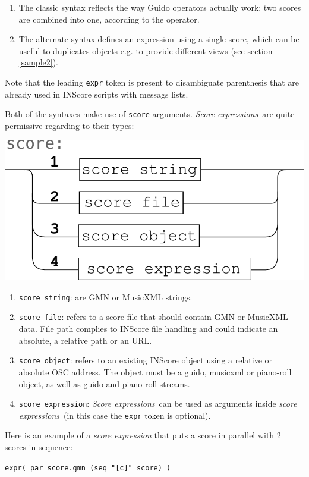 \documentclass{article}
\newcommand{\OSC}[1]{\texttt{#1}}
\newcommand{\sExpr}{\emph{score expressions}}
\newcommand{\SExpr}{\emph{Score expressions}}
\newcommand{\sample}	[1]			{\vspace{-0.2em}\begin{center}\colorbox{mygrey}{\begin{minipage}[t]{0.95\columnwidth} {\small \texttt{#1}}\end{minipage}}\end{center}}
\begin{document}
\begin{enumerate}
\item The classic syntax reflects the way Guido operators actually work: two scores are combined into one, according to the operator.
\item The alternate syntax defines an expression using a single score, which can be useful to duplicates objects e.g. to provide different views (see section \ref{sample2}).
\end{enumerate}

Note that the leading \OSC{expr} token is present to disambiguate parenthesis that are already used in INScore scripts with messags lists.

Both of the syntaxes make use of \OSC{score} arguments. \SExpr\ are quite permissive regarding to their types:
\begin{center}
\includegraphics[width=0.7\columnwidth]{imgs/syntax2}
\end{center}

\begin{enumerate}
\item \OSC{score string}: are GMN or MusicXML strings.
\item \OSC{score file}:  refers to a score file that should contain GMN or MusicXML data. File path complies to INScore file handling and could indicate an absolute, a relative path or an URL.
\item \OSC{score object}:  refers to an existing INScore object using a relative or absolute OSC address. The object must be a guido, musicxml or piano-roll object, as well as guido and piano-roll streams.
\item \OSC{score expression}:  \SExpr\ can be used as arguments inside \sExpr\ (in this case the \OSC{expr} token is optional).
\end{enumerate}

Here is an example of a \emph{score expression} that puts a score in parallel with 2 scores in sequence:
\sample{expr( par score.gmn (seq "[c]" score) )}


\end{document}
